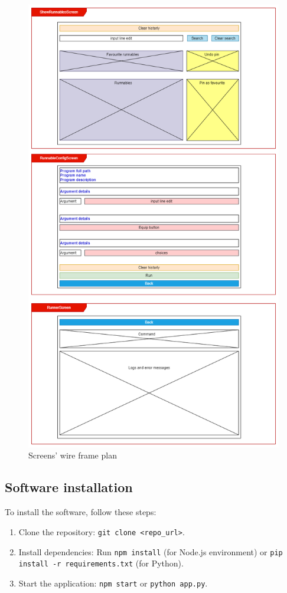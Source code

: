 \documentclass{article}
\begin{document}
\begin{figure}[h]
    \centering
    \includegraphics[width=1\linewidth]{img/wire_frame_plan.drawio.png}
    \caption{Screens' wire frame plan}
    \label{fig:enter-label}
\end{figure}

\newpage

\subsection{Software installation}
To install the software, follow these steps:
\begin{enumerate}
    \item Clone the repository: \texttt{git clone <repo\_url>}.
    \item Install dependencies: Run \texttt{npm install} (for Node.js environment) or \texttt{pip install -r requirements.txt} (for Python).
    \item Start the application: \texttt{npm start} or \texttt{python app.py}.
\end{enumerate}
\end{document}
